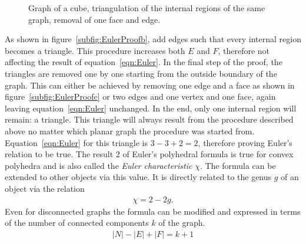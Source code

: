 \begin{figure}[htb]
{
            }
    \caption{\protect{} Graph of a cube, \protect{} triangulation of the internal regions of the same graph, \protect{} removal of one face and edge.}
    \label{fig:EulerProof}
\end{figure}
%
As shown in figure~\ref{subfig:EulerProofb}, add edges such that every internal
region becomes a triangle. This procedure increases both $E$ and $F$, therefore
not affecting the result of equation~\eqref{eqn:Euler}. In the final step of the
proof, the triangles are removed one by one starting from the outside boundary
of the graph. This can either be achieved by removing one edge and a face as
shown in figure~\ref{subfig:EulerProofc} or two edges and one vertex and one
face, again leaving equation~\eqref{eqn:Euler} unchanged. In the end, only one
internal region will remain: a triangle. This triangle will always result from
the procedure described above no matter which planar graph the procedure was
started from. Equation~\eqref{eqn:Euler} for this triangle is $3 - 3 + 2 = 2$,
therefore proving Euler's relation to be true. The result $2$ of Euler's
polyhedral formula is true for convex polyhedra and is also called the
\textit{Euler characteristic} $\chi$. The formula can be extended to other
objects via this value. It is directly related to the genus $g$ of an object via
the relation
%
\begin{align}
    \chi=2-2g.
\end{align}
%
Even for disconnected graphs the formula can be modified and expressed in terms
of the number of connected components $k$ of the graph.
%
\begin{align}
    |N|- |E| + |F| = k + 1
\end{align}

